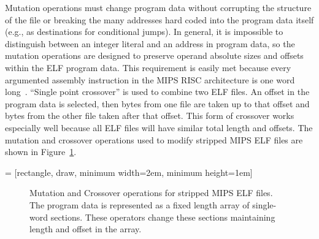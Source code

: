 \documentclass{sigcomm-alternate}
\begin{document}
Mutation operations must change program data without corrupting the
structure of the file or breaking the many addresses hard coded into
the program data itself (e.g., as destinations for conditional jumps).
In general, it is impossible to distinguish between an integer literal
and an address in program data, so the mutation operations are
designed to preserve operand absolute sizes and offsets within the ELF
program data.  This requirement is easily met because every argumented
assembly instruction in the MIPS RISC architecture is one word
long~\cite{hennessy1982mips}.  ``Single point crossover'' is used to
combine two ELF files.  An offset in the program data is selected,
then bytes from one file are taken up to that offset and bytes from
the other file taken after that offset.  This form of crossover works
especially well because all ELF files will have similar total length and
offsets. The mutation and crossover operations used to modify stripped
MIPS ELF files are shown in Figure~\ref{mutation-ops}.

 = [rectangle, draw, minimum width=2em, minimum height=1em]
\begin{figure}[htb]
  \centering
{}
\caption{Mutation and Crossover operations for stripped MIPS ELF files.  The
  program data is represented as a fixed length array of single-word
  sections.  These operators change these sections maintaining length
  and offset in the array.}
  \label{mutation-ops}
\end{figure}
\end{document}
